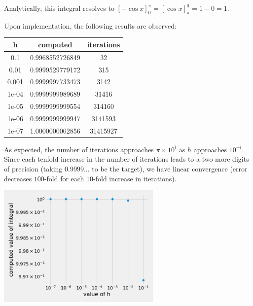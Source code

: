 Analytically, this integral resolves to $[-\cos x]^\pi_0 = [\cos x]^0_\pi = 1 - 0 = 1$.\bigskip

Upon implementation, the following results are observed:

\begin{center}
    \begin{tabular}{|c|c|c|}
        \hline \textbf{h} & \textbf{computed} & \textbf{iterations}\\
        \hline 0.1 & 0.9968552726849 & 32\\
        \hline 0.01 & 0.9999529779172 & 315\\
        \hline 0.001 & 0.9999997733473 & 3142\\
        \hline 1e-04 & 0.9999999989689 & 31416\\
        \hline 1e-05 & 0.9999999999554 & 314160\\
        \hline 1e-06 & 0.9999999999947 & 3141593\\
        \hline 1e-07 & 1.0000000002856 & 31415927\\
        \hline 
    \end{tabular}
\end{center}

As expected, the number of iterations approaches $\pi \times 10^i$ as $h$ approaches $10^{-i}$. Since each tenfold increase in the number of iterations leads to a two more digits of precision (taking $0.9999...$ to be the target), we have linear convergence (error decreases $100$-fold for each $10$-fold increase in iterations).

\begin{center}
    \includegraphics*[width=0.6\textwidth]{res/1.1-convergence.png}
\end{center}
